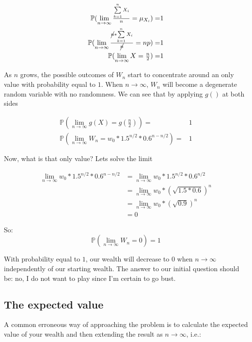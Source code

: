 \documentclass[12pt]{article}
\begin{document}
\begin{equation*}
  \begin{split}
    \mathbb{P}(\lim_{n\to\infty} \tfrac{\sum\limits_{k=1}^{n} X_i}{n} = \mu_{X_i}) =& 1\\
    \mathbb{P}(\lim_{n\to\infty} \tfrac{\cancel{n}*\sum\limits_{k=1}^{n} X_i}{\cancel{n}} = np) =& 1\\
    \mathbb{P}(\lim_{n\to\infty} X = \tfrac{n}{2}) =& 1
  \end{split}
\end{equation*}

As $n$ grows, the possible outcomes of $W_n$ start to concentrate around an only value with probability equal to $1$. When $n \rightarrow \infty$, $W_n$ will become a degenerate random variable with no randomness. We can see that by applying $g()$ at both sides

\begin{equation*}
  \begin{split}
    \mathbb{P}(\lim_{n\to\infty} g(X) = g(\tfrac{n}{2})) =& 1\\
    \mathbb{P}(\lim_{n\to\infty} W_n = w_0 * 1.5^{n/2} * 0.6^{n-n/2}) =& 1
    \end{split}
\end{equation*}

Now, what is that only value? Lets solve the limit

\begin{equation*}
  \begin{split}
    \lim_{n\to\infty} w_0 * 1.5^{n/2} * 0.6^{n-n/2} & = \lim_{n\to\infty}w_0 * 1.5^{n/2} * 0.6^{n/2} \\
    &= \lim_{n\to\infty}w_0 * (\sqrt{1.5*0.6})^{n}\\
    &= \lim_{n\to\infty}w_0 * (\sqrt{0.9}) ^{n}\\
    &= 0
  \end{split}
\end{equation*}

So:
\begin{equation*}
    \mathbb{P}(\lim_{n\to\infty} W_n = 0) = 1
\end{equation*}

With probability equal to $1$, our wealth will decrease to 0 when $n\to\infty$ independently of our starting wealth. The answer to our initial question should be: no, I do not want to play since I'm certain to go bust.

\subsection{The expected value}
A common erroneous way of approaching the problem is to calculate the expected value of your wealth and then extending the result as $n\to\infty$, i.e.:
\end{document}
